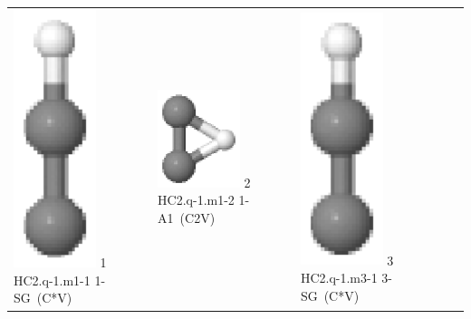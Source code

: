 \documentclass[10pt]{article}
\begin{document}
\vspace{0.5cm}
\begin{tabular}{|
>{\centering\arraybackslash}p{2.40000000000000000000cm}|
>{\centering\arraybackslash}p{2.40000000000000000000cm}|
>{\centering\arraybackslash}p{2.40000000000000000000cm}|
>{\centering\arraybackslash}p{2.40000000000000000000cm}|
>{\centering\arraybackslash}p{2.40000000000000000000cm}|
}
\hline
\multicolumn{4}{|c|}{HC$_{2}$} \\\hline
\includegraphics[width=2.40000000000000000000cm]{HC2.q-1.m1-1.eps} \tiny{1 \hspace{1.20000000000000000000cm} HC2.q-1.m1-1 \hspace{5pt} 1-SG~(C*V)} &
\includegraphics[width=2.40000000000000000000cm]{HC2.q-1.m1-2.eps} \tiny{2 \hspace{1.20000000000000000000cm} HC2.q-1.m1-2 \hspace{5pt} 1-A1~(C2V)} &
\includegraphics[width=2.40000000000000000000cm]{HC2.q-1.m3-1.eps} \tiny{3 \hspace{1.20000000000000000000cm} HC2.q-1.m3-1 \hspace{5pt} 3-SG~(C*V)} &

\end{tabular}
\end{document}

